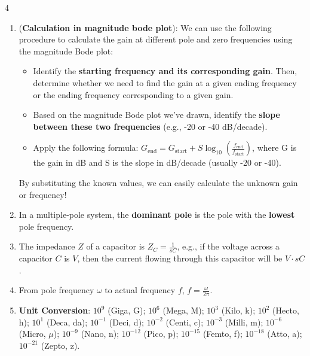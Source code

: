\documentclass[10pt, landscape]{article}
\begin{document}
\begin{multicols}{4}
\begin{enumerate}
\begin{itemize}
\begin{itemize}
        \end{itemize}
    \end{itemize}
    \item (\textbf{Calculation in magnitude bode plot}): We can use the following procedure to calculate the gain at different pole and zero frequencies using the magnitude Bode plot:
    \begin{itemize}
        \item Identify the \textbf{starting frequency and its corresponding gain}. Then, determine whether we need to find the gain at a given ending frequency or the ending frequency corresponding to a given gain.
        \item Based on the magnitude Bode plot we've drawn, identify the \textbf{slope between these two frequencies} (e.g., -20 or -40 dB/decade).
        \item Apply the following formula: $G_{\text{end}}=G_{\text{start}}+S\log_{10}\left(\frac{f_{\text{end}}}{f_{\text{start}}}\right)$, where G is the gain in dB and S is the slope in dB/decade (usually -20 or -40).
    \end{itemize}
    By substituting the known values, we can easily calculate the unknown gain or frequency!
    \item In a multiple-pole system, the \textbf{dominant pole} is the pole with the \textbf{lowest} pole frequency.
    \item The impedance $Z$ of a capacitor is $Z_C=\frac{1}{sC}$, e.g., if the voltage across a capacitor $C$ is $V$, then the current flowing through this capacitor will be $V\cdot sC$.
    \item From pole frequency $\omega$ to actual frequency $f$, $f=\frac{\omega}{2\pi}$.
    \item \textbf{Unit Conversion}: 
    $10^{9}$ (Giga, G);
    $10^{6}$ (Mega, M);
    $10^{3}$ (Kilo, k);
    $10^{2}$ (Hecto, h);
    $10^{1}$ (Deca, da);
    $10^{-1}$ (Deci, d);
    $10^{-2}$ (Centi, c);
    $10^{-3}$ (Milli, m);
    $10^{-6}$ (Micro, $\mu$);
    $10^{-9}$ (Nano, n);
    $10^{-12}$ (Pico, p);
    $10^{-15}$ (Femto, f);
    $10^{-18}$ (Atto, a);
    $10^{-21}$ (Zepto, z).
\end{enumerate}


\end{multicols}
\end{document}
